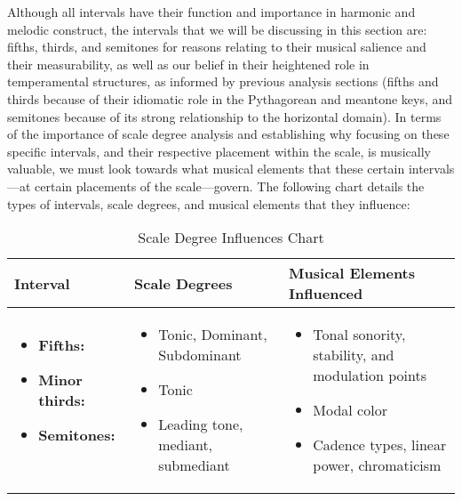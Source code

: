 Although all intervals have their function and importance in harmonic
and melodic construct, the intervals that we will be discussing in this
section are: fifths, thirds, and semitones for reasons relating to their
musical salience and their measurability, as well as our belief in their
heightened role in temperamental structures, as informed by previous
analysis sections (fifths and thirds because of their idiomatic role in
the Pythagorean and meantone keys, and semitones because of its strong
relationship to the horizontal domain). In terms of the importance of
scale degree analysis and establishing why focusing on these specific
intervals, and their respective placement within the scale, is musically
valuable, we must look towards what musical elements that these certain
intervals---at certain placements of the scale---govern. The
following chart details the types of intervals, scale degrees, and
musical elements that they influence:
\begin{table}[H]
\begin{singlespace}
\small
\centering
\begin{tabularx}{5.5in}{|>{\RaggedRight}X|>{\RaggedRight}X|>{\RaggedRight}X|}
\hline
\textbf{Interval} & \textbf{Scale Degrees} & \textbf{Musical Elements \newline Influenced} \\
\hline

\vspace{-1em}
\begin{itemize}[leftmargin=0cm]
    \item[] \textbf{Fifths: \newline~}
    \item[] \textbf{Minor thirds:}
    \item[] \textbf{Semitones: \newline~}
\end{itemize}
                  &

\vspace{-1em}
\begin{itemize}[leftmargin=*]
\item Tonic, Dominant, \newline Subdominant
\item Tonic
\item Leading tone, mediant, submediant
\end{itemize}
                  &
\vspace{-1em}
\begin{itemize}[leftmargin=*]
\item Tonal sonority, stability, \newline and modulation points
\item Modal color
\item Cadence types, linear power, chromaticism
\end{itemize}
\\

\hline
\end{tabularx}
\small
\end{singlespace}
\caption{Scale Degree Influences Chart}
\end{table}
